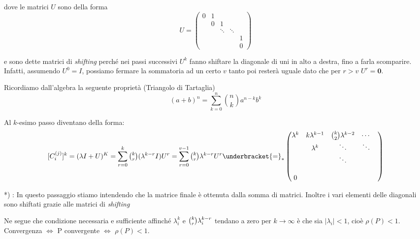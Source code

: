 \begin{thproof}
dove le matrici $U$ sono della forma
$$ U =
\begin{pmatrix}
0           & 1           &             &             &                               \\
            & 0           & 1           &             &                               \\
            &             & \ddots      & \ddots      &                               \\
            &             &             &             & 1                             \\
            &             &             &             & 0
\end{pmatrix} $$

e sono dette matrici di \emph{shifting} perch\'e nei passi successivi
$U^k$ fanno shiftare la diagonale di uni in alto a destra, fino a
farla scomparire. \\
Infatti, assumendo $U^0 = I$, possiamo fermare la sommatoria ad un
certo $v$ tanto poi rester\`a uguale dato che per $r>v$
$U^r = \mathbf{0}$.\\
\begin{notes}
Ricordiamo dall'algebra la seguente propriet\`a (Triangolo di Tartaglia)
$$(a+b)^n = \sum_{k=0}^n {n \choose k}a^{n-k}b^{k} $$
\end{notes}
Al $k$-esimo passo diventano della forma:
\[[C_{i}^{(j)}]^{k} = (\lambda I + U)^{K} = 
\sum_{r=0}^{k} \tbinom kr (\lambda^{k-r} I) U^r = 
\sum_{r=0}^{v-1} \tbinom kr \lambda^{k-r} U^r \underbracket{=}_{*} 
\begin{pmatrix}
\lambda^k & k \lambda^{k-1} & \tbinom k2 \lambda^{k-2} & \cdots & \\
          & \lambda^k       & \ddots                   & \ddots & \\
          &                 & \ddots                   &        & \\
          &                 &                          &        & \\
0         &                 &                          &        & \\
\end{pmatrix}\] 
\begin{notes}
 *) : In questo passaggio stiamo intendendo che la matrice
 finale \`e ottenuta dalla somma di matrici. Inoltre i vari elementi
delle diagonali sono shiftati grazie alle matrici di \emph{shifting}
\end{notes}

Ne segue che condizione necessaria e sufficiente affinch\'e
$\lambda^{k}_i$ e $\tbinom kr \lambda^{k-r}_i$ tendano a zero per $k
\to \infty$ \`e che sia $|\lambda_i|<1$, cio\`e $\rho(P)<1$.\\
Convergenza $\Longleftrightarrow$ P convergente $\Longleftrightarrow$
$\rho(P) <1$.
\end{thproof}

